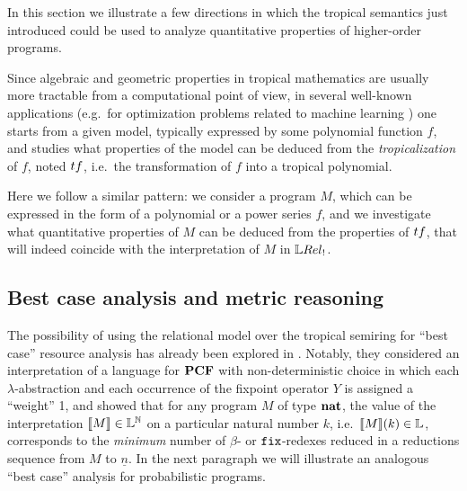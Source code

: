 

In this section we illustrate a few directions in which the tropical semantics just introduced could be used to analyze quantitative properties of higher-order programs. 

Since algebraic and geometric properties in tropical mathematics are usually more tractable from a computational point of view, in several well-known applications (e.g.~for optimization problems related to machine learning \cite{Pachter2004, Zhang2018, Maragos2021}) one starts from a given model, typically expressed by some polynomial function $f$, and studies 
what properties of the model can be deduced from the \emph{tropicalization} of $f$, noted $\trop f$, i.e.~the transformation of $f$ into a tropical polynomial.


%
%
%


Here we follow a similar pattern: we consider a program $M$, which can be expressed in the form of a polynomial or a power series $f$, and we 
investigate what quantitative properties of $M$ can be deduced from the properties of $\trop f$, that will indeed coincide with the interpretation of $M$ in $\LREL_{!}$.






\subsection{Best case analysis and metric reasoning}

The possibility of using the relational model over the tropical semiring for ``best case'' resource analysis has already been explored in \cite{Manzo2013}. Notably, they considered an interpretation of a language for $\mathbf{PCF}$ with non-deterministic choice in which each $\lambda$-abstraction and each occurrence of the fixpoint operator $Y$ is assigned a ``weight'' 1, and showed that for any program $M$ of type $\mathbf{nat}$, 
the value of the interpretation $\llbracket M\rrbracket\in \mathbb{L}^{\mathbb{N}}$ on a particular natural number $k$, i.e.~$\llbracket M\rrbracket(k)\in \mathbb{L}$, corresponds to the \emph{minimum} number of $\beta$- or $\mathtt{fix}$-redexes reduced in a reductions sequence from $M$ to $\underline n$. 
In the next paragraph we will illustrate an analogous ``best case'' analysis for probabilistic programs.

